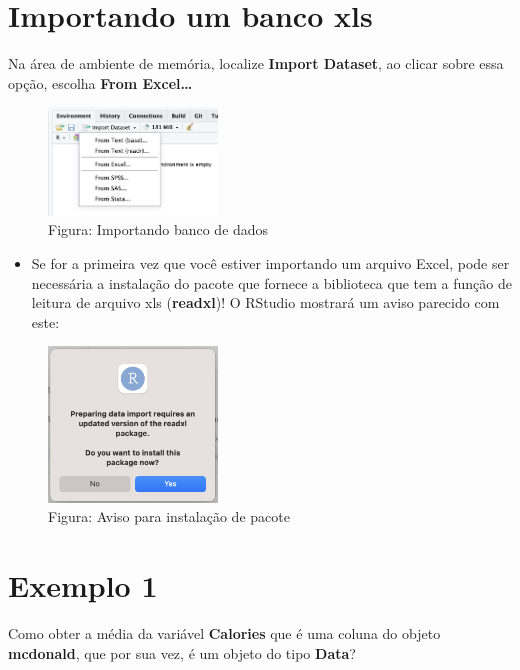 \documentclass[
]{book}
\providecommand{\tightlist}{%
  \setlength{\itemsep}{0pt}\setlength{\parskip}{0pt}}
\begin{document}
\section{Importando um banco xls}\label{importando-um-banco-xls}

Na área de ambiente de memória, localize \textbf{Import Dataset}, ao clicar sobre essa opção, escolha \textbf{From Excel\ldots{}}

\begin{figure}
\centering
\includegraphics[width=0.4\textwidth,height=\textheight]{telaImportDataset.png}
\caption{ Figura: Importando banco de dados}
\end{figure}

\begin{itemize}
\tightlist
\item
  Se for a primeira vez que você estiver importando um arquivo Excel, pode ser necessária a instalação do pacote que fornece a biblioteca que tem a função de leitura de arquivo xls (\textbf{readxl})! O RStudio mostrará um aviso parecido com este:
\end{itemize}

\begin{figure}
\centering
\includegraphics[width=0.4\textwidth,height=\textheight]{telaImportPacote.png}
\caption{ Figura: Aviso para instalação de pacote}
\end{figure}

\section{Exemplo 1}\label{exemplo-1-1}

Como obter a média da variável \textbf{Calories} que é uma coluna do objeto \textbf{mcdonald}, que por sua vez, é um objeto do tipo \textbf{Data}?
\end{document}
